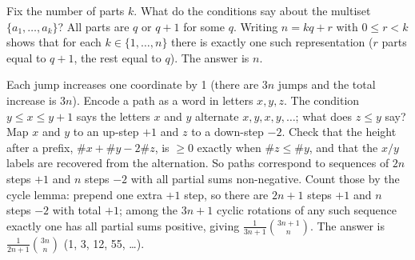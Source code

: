 \documentclass[11pt,a4paper]{article}
\begin{document}
Fix the number of parts \(k\). What do the conditions say about the multiset \(\{a_1,\dots,a_k\}\)?
All parts are \(q\) or \(q+1\) for some \(q\). Writing \(n=kq+r\) with \(0\le r\lt k\) shows that for each \(k\in\{1,\dots,n\}\) there is exactly one such representation (\(r\) parts equal to \(q+1\), the rest equal to \(q\)). The answer is \(n\).

Each jump increases one coordinate by 1 (there are \(3n\) jumps and the total increase is \(3n\)). Encode a path as a word in letters \(x,y,z\). The condition \(y\le x\le y+1\) says the letters \(x\) and \(y\) alternate \(x,y,x,y,\dots\); what does \(z\le y\) say?
Map \(x\) and \(y\) to an up-step \(+1\) and \(z\) to a down-step \(-2\). Check that the height after a prefix, \(\#x+\#y-2\#z\), is \(\ge0\) exactly when \(\#z\le\#y\), and that the \(x/y\) labels are recovered from the alternation. So paths correspond to sequences of \(2n\) steps \(+1\) and \(n\) steps \(-2\) with all partial sums non-negative.
Count those by the cycle lemma: prepend one extra \(+1\) step, so there are \(2n+1\) steps \(+1\) and \(n\) steps \(-2\) with total \(+1\); among the \(3n+1\) cyclic rotations of any such sequence exactly one has all partial sums positive, giving \(\frac{1}{3n+1}\binom{3n+1}{n}\). The answer is \(\frac{1}{2n+1}\binom{3n}{n}\) (1, 3, 12, 55, \ldots).
\end{document}
